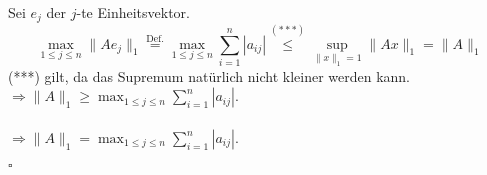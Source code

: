 \documentclass[11pt,a4paper,ngerman]{article}
\begin{document}
Sei $e_j$ der $j$-te Einheitsvektor.\\
$$    \max_{1 \leq j \leq n}{\| Ae_j \|_{1}} 
\stackrel{\text{Def.}}{=}     \max_{1 \leq j \leq n}{\sum_{i=1}^{n}{|a_{ij}|}}
\stackrel{(***)}{\leq}  \sup_{\|x\|_{1} = 1}{\|Ax\|_{1}}
=     \| A \|_1
$$
(***) gilt, da das Supremum natürlich nicht kleiner werden kann.\\
$\Rightarrow \|A\|_{1} \geq \max_{1 \leq j \leq n}{\sum_{i=1}^{n}{|a_{ij}|}}$.\\ \\
$\Longrightarrow \|A\|_{1} = \max_{1 \leq j \leq n}{\sum_{i=1}^{n}{|a_{ij}|}}$.

\mbox{}\hfill $\square$

\label{LastPage}
\end{document}
